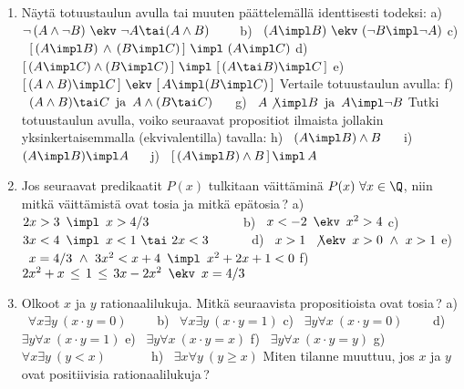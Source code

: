 \begin{enumerate}
\item \label{H-I-3: tautologioita}
Näytä totuustaulun avulla tai muuten päättelemällä identtisesti todeksi: 
\vspace{1mm}\newline
a) \ $\neg\,(A \wedge \neg B)\ \ekv\ \neg A \tai (A \wedge B) \qquad$
b) \ $(A \impl B)\ \ekv\ (\neg B \impl \neg A)$ \newline
c) \ $[\,(A \impl B)\,\wedge\,(B \impl C)\,]\ \impl\ (A \impl C)$ \newline
d) \ $[\,(A \impl C)\wedge(B \impl C)\,]\ \impl\ [\,(A \tai B) \impl C\,]$ \newline
e) \ $[\,(A \wedge B) \impl C\,]\ \ekv\ [\,A \impl (B \impl C)\,]$ \vspace{1mm}\newline
Vertaile totuustaulun avulla: \vspace{1mm}\newline
f) \ $(A \wedge B) \tai C\,\ \text{ja}\,\ A \wedge (B \tai C) \quad\ $  
g) \ $A \not\impl B\,\ \text{ja}\,\ A\impl\neg B$ \vspace{1mm}\newline
Tutki totuustaulun avulla, voiko seuraavat propositiot ilmaista jollakin yksinkertaisemmalla
(ekvivalentilla) tavalla: \vspace{1mm}\newline
h) \ $(A \impl B) \wedge B \quad\ $ 
i) \ $(A \impl B) \impl A \quad\ $ 
j) \ $[\,(A \impl B) \wedge B\,]\,\impl\,A$

\item
Jos seuraavat predikaatit $P(x)$ tulkitaan väittäminä $P(x)\ \forall x\in\Q$, niin mitkä 
väittämistä ovat tosia ja mitkä epätosia\,? \vspace{1mm}\newline
a) \ $2x>3\,\ \impl\,\ x>4/3 \qquad\qquad\qquad\quad$
b) \ $x<-2\,\ \ekv\,\ x^2>4$ \newline
c) \ $3x<4\,\ \impl\,\ x<1\ \tai\ 2x<3 \qquad\quad$
d) \ $x>1\,\ \not\ekv\,\ x>0\ \wedge\ x>1$ \newline
e) \ $x=4/3\ \wedge\ 3x^2<x+4\,\ \impl\,\ x^2+2x+1<0$ \newline
f) \ $2x^2+x\,\le\,1\,\le\,3x-2x^2\,\ \ekv\,\ x=4/3$ \newline

\item
Olkoot $x$ ja $y$ rationaalilukuja. Mitkä seuraavista propositioista ovat tosia\,? \newline
a) \ $\forall x \exists y\ (x \cdot y = 0) \qquad$ 
b) \ $\forall x \exists y\ (x \cdot y = 1)$ \newline
c) \ $\exists y \forall x\ (x \cdot y = 0) \qquad$ 
d) \ $\exists y \forall x\ (x \cdot y = 1)$ \newline
e) \ $\exists y \forall x\ (x \cdot y = x)$ \qquad 
f) \ $\exists y \forall x\ (x \cdot y = y)$ \newline
g) \ $\forall x \exists y\ (y<x) \qquad\quad\,$
h) \ $\exists x \forall y\ (y \ge x)$ \newline
Miten tilanne muuttuu, jos $x$ ja $y$ ovat positiivisia rationaalilukuja\,?


\end{enumerate}
